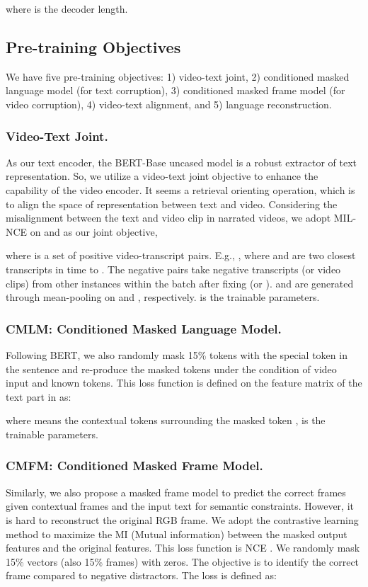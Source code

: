 \documentclass[11pt,a4paper]{article}
\begin{document}
	where  is the decoder length.
	
	\subsection{Pre-training Objectives}
	We have five pre-training objectives: 1) video-text joint, 2) conditioned masked language model (for text corruption), 3) conditioned masked frame model (for video corruption), 4) video-text alignment, and 5) language reconstruction.
	
	\subsubsection{Video-Text Joint.} As our text encoder, the BERT-Base uncased model is a robust extractor of text representation. So, we utilize a video-text joint objective to enhance the capability of the video encoder. It seems a retrieval orienting operation, which is to align the space of representation between text and video. Considering the misalignment between the text and video clip in narrated videos, we adopt MIL-NCE \cite{miech19endtoend} on  and  as our joint objective,
	
	where  is a set of positive video-transcript pairs. E.g., , where  and  are two closest transcripts in time to . The negative pairs  take negative transcripts (or video clips) from other instances within the batch  after fixing  (or ).  and  are generated through mean-pooling on  and , respectively.   is the trainable parameters.
	
	\subsubsection{CMLM: Conditioned Masked Language Model.} Following BERT, we also randomly mask 15\% tokens with the special token  in the sentence and re-produce the masked tokens under the condition of video input and known tokens.  This loss function is defined on the feature matrix of the text part in  as: 
	
	where  means the contextual tokens surrounding the masked token ,  is the trainable parameters.
	
	\subsubsection{CMFM: Conditioned Masked Frame Model.} Similarly, we also propose a masked frame model to predict the correct frames given contextual frames and the input text for semantic constraints. However, it is hard to reconstruct the original RGB frame. We adopt the contrastive learning method to maximize the MI (Mutual information) between the masked output features and the original features. This loss function is NCE \cite{sun2019contrastive}. We randomly mask 15\% vectors (also 15\% frames) with zeros. The objective is to identify the correct frame compared to negative distractors. The loss is defined as:
	
\end{document}
